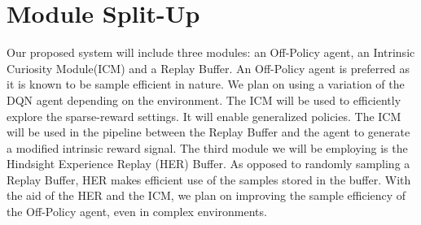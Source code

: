 \documentclass[12pt,a4paper]{article}
\begin{document}
\section{Module Split-Up}
Our proposed system will include three modules: an Off-Policy agent, an Intrinsic Curiosity Module(ICM) and a Replay Buffer.
An Off-Policy agent is preferred as it is known to be sample efficient in nature. We plan on using a
variation of the DQN agent depending on the environment. The ICM will be used to efficiently 
explore the sparse-reward settings. It will enable generalized policies. The ICM will be used in
the pipeline between the Replay Buffer and the agent to generate a modified intrinsic reward signal.
The third module we will be employing is the Hindsight Experience Replay (HER) Buffer. As
opposed to randomly sampling a Replay Buffer, HER makes efficient use of the samples stored in the buffer. With
the aid of the HER and the ICM, we plan on improving the sample efficiency of the Off-Policy agent, even in complex
environments.



\end{document}
